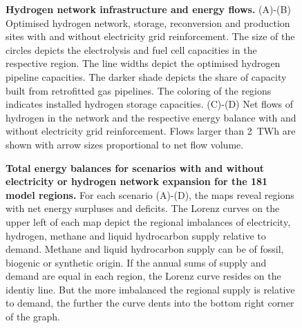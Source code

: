 

\begin{figure}
    \caption{ \textbf{Hydrogen network infrastructure and energy flows.}
    (A)-(B) Optimised hydrogen network, storage, reconversion and production
    sites with and without electricity grid reinforcement. The size of the
    circles depicts the electrolysis and fuel cell capacities in the respective
    region. The line widths depict the optimised hydrogen pipeline capacities.
    The darker shade depicts the share of capacity built from retrofitted gas
    pipelines. The coloring of the regions indicates installed hydrogen storage
    capacities.
    (C)-(D) Net flows of hydrogen in the network and the respective energy
    balance  with and without electricity grid reinforcement. Flows larger than
    2~TWh are shown with arrow sizes proportional to net flow volume.}
    \label{fig:h2-network}
\end{figure}



\begin{figure}
    \caption{ \textbf{Total energy balances for scenarios with and without
    electricity or hydrogen network expansion for the 181 model regions.} For
    each scenario (A)-(D), the maps reveal regions with net energy surpluses and
    deficits. The Lorenz curves on the upper left of each map depict the
    regional imbalances of electricity, hydrogen, methane and liquid hydrocarbon
    supply relative to demand. Methane and liquid hydrocarbon supply can be of
    fossil, biogenic or synthetic origin. If the annual sums of supply and
    demand are equal in each region, the Lorenz curve resides on the identiy
    line. But the more imbalanced the regional supply is relative to demand, the
    further the curve dents into the bottom right corner of the graph.}
    \label{fig:io}
\end{figure}
